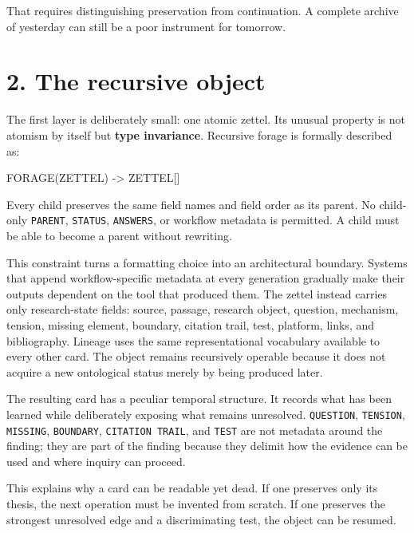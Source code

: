 \documentclass[
  11pt,
]{article}
\newenvironment{Shaded}{}{}
\newcommand{\NormalTok}[1]{#1}
\begin{document}
That requires distinguishing preservation from continuation. A complete
archive of yesterday can still be a poor instrument for tomorrow.

\section{2. The recursive object}\label{the-recursive-object}

The first layer is deliberately small: one atomic zettel. Its unusual
property is not atomism by itself but \textbf{type invariance}.
Recursive forage is formally described as:

\begin{Shaded}
\begin{Highlighting}[]
\NormalTok{FORAGE(ZETTEL) {-}\textgreater{} ZETTEL[]}
\end{Highlighting}
\end{Shaded}

Every child preserves the same field names and field order as its
parent. No child-only \texttt{PARENT}, \texttt{STATUS},
\texttt{ANSWERS}, or workflow metadata is permitted. A child must be
able to become a parent without rewriting.

This constraint turns a formatting choice into an architectural
boundary. Systems that append workflow-specific metadata at every
generation gradually make their outputs dependent on the tool that
produced them. The zettel instead carries only research-state fields:
source, passage, research object, question, mechanism, tension, missing
element, boundary, citation trail, test, platform, links, and
bibliography. Lineage uses the same representational vocabulary
available to every other card. The object remains recursively operable
because it does not acquire a new ontological status merely by being
produced later.

The resulting card has a peculiar temporal structure. It records what
has been learned while deliberately exposing what remains unresolved.
\texttt{QUESTION}, \texttt{TENSION}, \texttt{MISSING},
\texttt{BOUNDARY}, \texttt{CITATION\ TRAIL}, and \texttt{TEST} are not
metadata around the finding; they are part of the finding because they
delimit how the evidence can be used and where inquiry can proceed.

This explains why a card can be readable yet dead. If one preserves only
its thesis, the next operation must be invented from scratch. If one
preserves the strongest unresolved edge and a discriminating test, the
object can be resumed.
\end{document}
